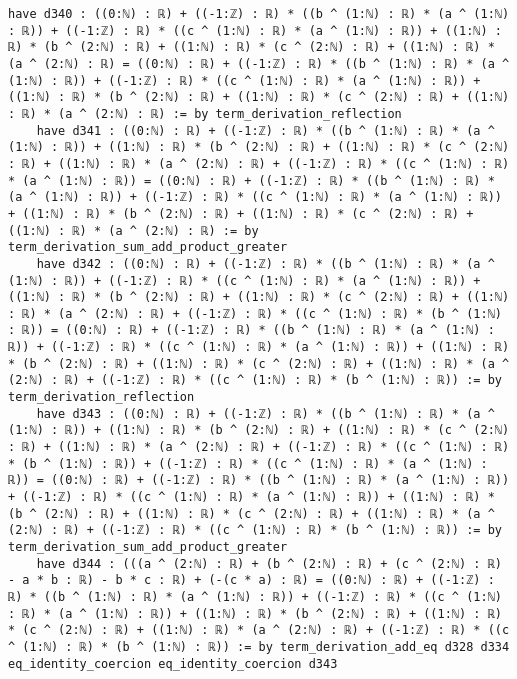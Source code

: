 \documentclass{article}
\begin{document}
\begin{tcolorbox}[colback=white!10, width=\linewidth]
\begin{lstlisting}[language=Lean4]
    have d340 : ((0:ℕ) : ℝ) + ((-1:ℤ) : ℝ) * ((b ^ (1:ℕ) : ℝ) * (a ^ (1:ℕ) : ℝ)) + ((-1:ℤ) : ℝ) * ((c ^ (1:ℕ) : ℝ) * (a ^ (1:ℕ) : ℝ)) + ((1:ℕ) : ℝ) * (b ^ (2:ℕ) : ℝ) + ((1:ℕ) : ℝ) * (c ^ (2:ℕ) : ℝ) + ((1:ℕ) : ℝ) * (a ^ (2:ℕ) : ℝ) = ((0:ℕ) : ℝ) + ((-1:ℤ) : ℝ) * ((b ^ (1:ℕ) : ℝ) * (a ^ (1:ℕ) : ℝ)) + ((-1:ℤ) : ℝ) * ((c ^ (1:ℕ) : ℝ) * (a ^ (1:ℕ) : ℝ)) + ((1:ℕ) : ℝ) * (b ^ (2:ℕ) : ℝ) + ((1:ℕ) : ℝ) * (c ^ (2:ℕ) : ℝ) + ((1:ℕ) : ℝ) * (a ^ (2:ℕ) : ℝ) := by term_derivation_reflection
    have d341 : ((0:ℕ) : ℝ) + ((-1:ℤ) : ℝ) * ((b ^ (1:ℕ) : ℝ) * (a ^ (1:ℕ) : ℝ)) + ((1:ℕ) : ℝ) * (b ^ (2:ℕ) : ℝ) + ((1:ℕ) : ℝ) * (c ^ (2:ℕ) : ℝ) + ((1:ℕ) : ℝ) * (a ^ (2:ℕ) : ℝ) + ((-1:ℤ) : ℝ) * ((c ^ (1:ℕ) : ℝ) * (a ^ (1:ℕ) : ℝ)) = ((0:ℕ) : ℝ) + ((-1:ℤ) : ℝ) * ((b ^ (1:ℕ) : ℝ) * (a ^ (1:ℕ) : ℝ)) + ((-1:ℤ) : ℝ) * ((c ^ (1:ℕ) : ℝ) * (a ^ (1:ℕ) : ℝ)) + ((1:ℕ) : ℝ) * (b ^ (2:ℕ) : ℝ) + ((1:ℕ) : ℝ) * (c ^ (2:ℕ) : ℝ) + ((1:ℕ) : ℝ) * (a ^ (2:ℕ) : ℝ) := by term_derivation_sum_add_product_greater
    have d342 : ((0:ℕ) : ℝ) + ((-1:ℤ) : ℝ) * ((b ^ (1:ℕ) : ℝ) * (a ^ (1:ℕ) : ℝ)) + ((-1:ℤ) : ℝ) * ((c ^ (1:ℕ) : ℝ) * (a ^ (1:ℕ) : ℝ)) + ((1:ℕ) : ℝ) * (b ^ (2:ℕ) : ℝ) + ((1:ℕ) : ℝ) * (c ^ (2:ℕ) : ℝ) + ((1:ℕ) : ℝ) * (a ^ (2:ℕ) : ℝ) + ((-1:ℤ) : ℝ) * ((c ^ (1:ℕ) : ℝ) * (b ^ (1:ℕ) : ℝ)) = ((0:ℕ) : ℝ) + ((-1:ℤ) : ℝ) * ((b ^ (1:ℕ) : ℝ) * (a ^ (1:ℕ) : ℝ)) + ((-1:ℤ) : ℝ) * ((c ^ (1:ℕ) : ℝ) * (a ^ (1:ℕ) : ℝ)) + ((1:ℕ) : ℝ) * (b ^ (2:ℕ) : ℝ) + ((1:ℕ) : ℝ) * (c ^ (2:ℕ) : ℝ) + ((1:ℕ) : ℝ) * (a ^ (2:ℕ) : ℝ) + ((-1:ℤ) : ℝ) * ((c ^ (1:ℕ) : ℝ) * (b ^ (1:ℕ) : ℝ)) := by term_derivation_reflection
    have d343 : ((0:ℕ) : ℝ) + ((-1:ℤ) : ℝ) * ((b ^ (1:ℕ) : ℝ) * (a ^ (1:ℕ) : ℝ)) + ((1:ℕ) : ℝ) * (b ^ (2:ℕ) : ℝ) + ((1:ℕ) : ℝ) * (c ^ (2:ℕ) : ℝ) + ((1:ℕ) : ℝ) * (a ^ (2:ℕ) : ℝ) + ((-1:ℤ) : ℝ) * ((c ^ (1:ℕ) : ℝ) * (b ^ (1:ℕ) : ℝ)) + ((-1:ℤ) : ℝ) * ((c ^ (1:ℕ) : ℝ) * (a ^ (1:ℕ) : ℝ)) = ((0:ℕ) : ℝ) + ((-1:ℤ) : ℝ) * ((b ^ (1:ℕ) : ℝ) * (a ^ (1:ℕ) : ℝ)) + ((-1:ℤ) : ℝ) * ((c ^ (1:ℕ) : ℝ) * (a ^ (1:ℕ) : ℝ)) + ((1:ℕ) : ℝ) * (b ^ (2:ℕ) : ℝ) + ((1:ℕ) : ℝ) * (c ^ (2:ℕ) : ℝ) + ((1:ℕ) : ℝ) * (a ^ (2:ℕ) : ℝ) + ((-1:ℤ) : ℝ) * ((c ^ (1:ℕ) : ℝ) * (b ^ (1:ℕ) : ℝ)) := by term_derivation_sum_add_product_greater
    have d344 : (((a ^ (2:ℕ) : ℝ) + (b ^ (2:ℕ) : ℝ) + (c ^ (2:ℕ) : ℝ) - a * b : ℝ) - b * c : ℝ) + (-(c * a) : ℝ) = ((0:ℕ) : ℝ) + ((-1:ℤ) : ℝ) * ((b ^ (1:ℕ) : ℝ) * (a ^ (1:ℕ) : ℝ)) + ((-1:ℤ) : ℝ) * ((c ^ (1:ℕ) : ℝ) * (a ^ (1:ℕ) : ℝ)) + ((1:ℕ) : ℝ) * (b ^ (2:ℕ) : ℝ) + ((1:ℕ) : ℝ) * (c ^ (2:ℕ) : ℝ) + ((1:ℕ) : ℝ) * (a ^ (2:ℕ) : ℝ) + ((-1:ℤ) : ℝ) * ((c ^ (1:ℕ) : ℝ) * (b ^ (1:ℕ) : ℝ)) := by term_derivation_add_eq d328 d334 eq_identity_coercion eq_identity_coercion d343

\end{lstlisting}
\end{tcolorbox}
\end{document}
